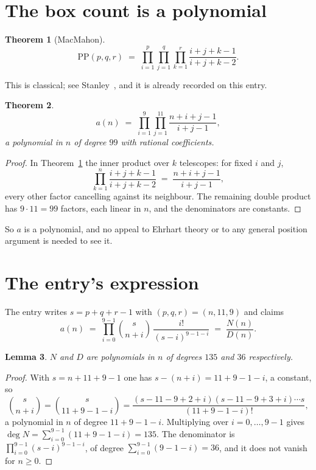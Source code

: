 \documentclass[11pt,a4paper]{article}
\theoremstyle{plain}
\newtheorem{theorem}{Theorem}
\newtheorem{lemma}[theorem]{Lemma}
\theoremstyle{definition}
\begin{document}
\section{The box count is a polynomial}

\begin{theorem}[MacMahon]\label{thm:mm}
\[
\mathrm{PP}(p,q,r)\;=\;\prod_{i=1}^{p}\prod_{j=1}^{q}\prod_{k=1}^{r}
\frac{i+j+k-1}{i+j+k-2} .
\]
\end{theorem}

This is classical; see Stanley~\cite{stanley}, and it is already recorded on this entry.

\begin{theorem}\label{thm:poly}
\[
a(n)\;=\;\prod_{i=1}^{9}\prod_{j=1}^{11}\frac{n+i+j-1}{i+j-1},
\]
a polynomial in $n$ of degree $99$ with rational coefficients.
\end{theorem}

\begin{proof}
In Theorem~\ref{thm:mm} the inner product over $k$ telescopes: for fixed $i$ and $j$,
\[
\prod_{k=1}^{n}\frac{i+j+k-1}{i+j+k-2}\;=\;\frac{n+i+j-1}{i+j-1} ,
\]
every other factor cancelling against its neighbour. The remaining double product has
$9\cdot11=99$ factors, each linear in $n$, and the denominators are constants.
\end{proof}

So $a$ is a polynomial, and no appeal to Ehrhart theory or to any general position argument is
needed to see it.

\section{The entry's expression}

The entry writes $s=p+q+r-1$ with $(p,q,r)=(n,11,9)$ and claims
\[
a(n)\;=\;\prod_{i=0}^{9-1}\binom{s}{n+i}\,\frac{i!}{(s-i)^{9-1-i}}\;=\;
\frac{N(n)}{D(n)} .
\]

\begin{lemma}\label{lem:deg}
$N$ and $D$ are polynomials in $n$ of degrees $135$ and $36$ respectively.
\end{lemma}

\begin{proof}
With $s=n+11+9-1$ one has $s-(n+i)=11+9-1-i$, a constant, so
\[
\binom{s}{n+i}=\binom{s}{11+9-1-i}
=\frac{(s-11-9+2+i)(s-11-9+3+i)\cdots s}{(11+9-1-i)!},
\]
a polynomial in $n$ of degree $11+9-1-i$. Multiplying over $i=0,\dots,9-1$ gives
$\deg N=\sum_{i=0}^{9-1}(11+9-1-i)=135$. The denominator is
$\prod_{i=0}^{9-1}(s-i)^{9-1-i}$, of degree
$\sum_{i=0}^{9-1}(9-1-i)=36$, and it does not vanish for $n\ge0$.
\end{proof}
\end{document}
